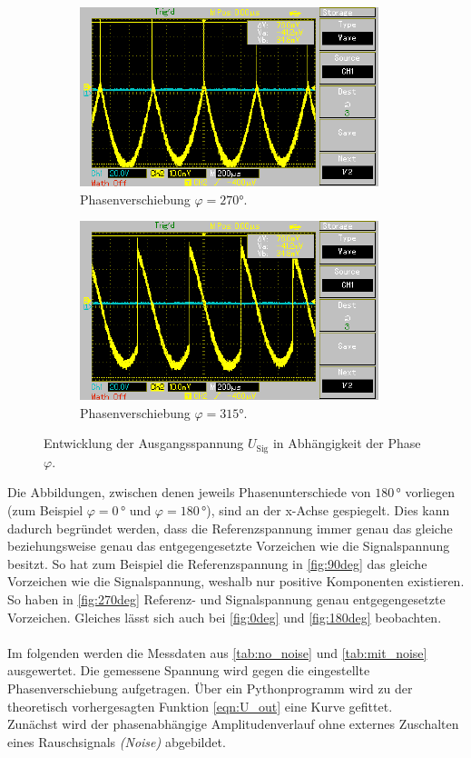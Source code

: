 \begin{figure}
\begin{subfigure}{0.48\textwidth}
        \centering
        \includegraphics{./content/Oszilloskop_270.pdf}
        \caption{Phasenverschiebung $\varphi = 270°$.}
        \label{fig:270deg}
    \end{subfigure}
    \hfill
    \begin{subfigure}{0.48\textwidth}
        \centering
        \includegraphics{./content/Oszilloskop_315.pdf}
        \caption{Phasenverschiebung $\varphi = 315°$.}
        \label{fig:315deg}
    \end{subfigure}    
\caption{Entwicklung der Ausgangsspannung $U_\text{Sig}$ in Abhängigkeit der Phase $\varphi$.}
\end{figure}

\noindent
Die Abbildungen, zwischen denen jeweils Phasenunterschiede von $180\,\unit{\degree}$ vorliegen (zum Beispiel $\varphi = 0\,\unit{\degree}$ und $\varphi = 180\,\unit{\degree}$), 
sind an der x-Achse gespiegelt. Dies kann dadurch begründet werden, dass die
Referenzspannung immer genau das gleiche beziehungsweise genau das entgegengesetzte Vorzeichen wie die 
Signalspannung besitzt. So hat zum Beispiel die Referenzspannung in \autoref{fig:90deg} das gleiche Vorzeichen wie die 
Signalspannung, weshalb nur positive Komponenten existieren. So haben in \autoref{fig:270deg} Referenz- und 
Signalspannung genau entgegengesetzte Vorzeichen.
Gleiches lässt sich auch bei \autoref{fig:0deg} und \autoref{fig:180deg} beobachten.\\\\
\noindent
Im folgenden werden die Messdaten aus \autoref{tab:no_noise} und \autoref{tab:mit_noise} ausgewertet. Die gemessene 
Spannung wird gegen die eingestellte Phasenverschiebung aufgetragen. Über ein Pythonprogramm wird zu der 
theoretisch vorhergesagten Funktion \eqref{eqn:U_out} eine Kurve gefittet.\\
Zunächst wird der phasenabhängige Amplitudenverlauf ohne externes Zuschalten eines Rauschsignals \emph{(Noise)} abgebildet.

